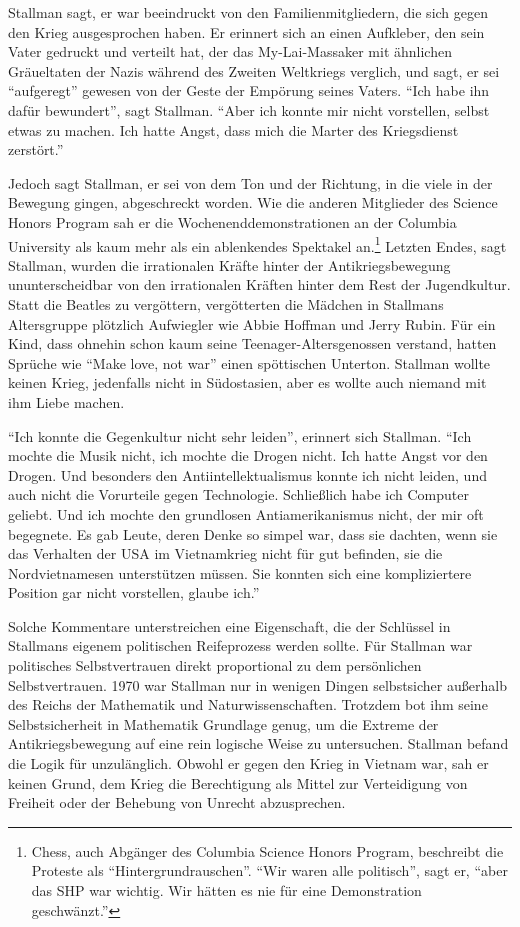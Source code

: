 Stallman sagt, er war beeindruckt von den Familienmitgliedern, die sich gegen den Krieg ausgesprochen haben. Er erinnert sich an einen Aufkleber, den sein Vater gedruckt und verteilt hat, der das My-Lai-Massaker mit ähnlichen Gräueltaten der Nazis während des Zweiten Weltkriegs verglich, und sagt, er sei "`aufgeregt"' gewesen von der Geste der Empörung seines Vaters. "`Ich habe ihn dafür bewundert"', sagt Stallman. "`Aber ich konnte mir nicht vorstellen, selbst etwas zu machen. Ich hatte Angst, dass mich die Marter des Kriegsdienst zerstört."'

Jedoch sagt Stallman, er sei von dem Ton und der Richtung, in die viele in der Bewegung gingen, abgeschreckt worden. Wie die anderen Mitglieder des Science Honors Program sah er die Wochenenddemonstrationen an der Columbia University als kaum mehr als ein ablenkendes Spektakel an.\footnote{Chess, auch Abgänger des Columbia Science Honors Program, beschreibt die Proteste als "`Hintergrundrauschen"'. "`Wir waren alle politisch"', sagt er, "`aber das SHP war wichtig. Wir hätten es nie für eine Demonstration geschwänzt."'} Letzten Endes, sagt Stallman, wurden die irrationalen Kräfte hinter der Antikriegsbewegung ununterscheidbar von den irrationalen Kräften hinter dem Rest der Jugendkultur. Statt die Beatles zu vergöttern, vergötterten die Mädchen in Stallmans Altersgruppe plötzlich Aufwiegler wie Abbie Hoffman und Jerry Rubin. Für ein Kind, dass ohnehin schon kaum seine Teenager-Altersgenossen verstand, hatten Sprüche wie "`Make love, not war"' einen spöttischen Unterton. Stallman wollte keinen Krieg, jedenfalls nicht in Südostasien, aber es wollte auch niemand mit ihm Liebe machen.

"`Ich konnte die Gegenkultur nicht sehr leiden"', erinnert sich Stallman. "`Ich mochte die Musik nicht, ich mochte die Drogen nicht. Ich hatte Angst vor den Drogen. Und besonders den Antiintellektualismus konnte ich nicht leiden, und auch nicht die Vorurteile gegen Technologie. Schließlich habe ich Computer geliebt. Und ich mochte den grundlosen Antiamerikanismus nicht, der mir oft begegnete. Es gab Leute, deren Denke so simpel war, dass sie dachten, wenn sie das Verhalten der USA im Vietnamkrieg nicht für gut befinden, sie die Nordvietnamesen unterstützen müssen. Sie konnten sich eine kompliziertere Position gar nicht vorstellen, glaube ich."'

Solche Kommentare unterstreichen eine Eigenschaft, die der Schlüssel in Stallmans eigenem politischen Reifeprozess werden sollte. Für Stallman war politisches Selbstvertrauen direkt proportional zu dem persönlichen Selbstvertrauen. 1970 war Stallman nur in wenigen Dingen selbstsicher außerhalb des Reichs der Mathematik und Naturwissenschaften. Trotzdem bot ihm seine Selbstsicherheit in Mathematik Grundlage genug, um die Extreme der Antikriegsbewegung auf eine rein logische Weise zu untersuchen. Stallman befand die Logik für unzulänglich. Obwohl er gegen den Krieg in Vietnam war, sah er keinen Grund, dem Krieg die Berechtigung als Mittel zur Verteidigung von Freiheit oder der Behebung von Unrecht abzusprechen.

